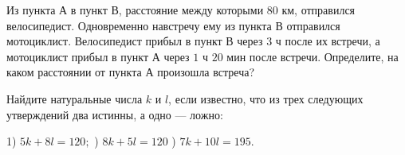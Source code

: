 Из пункта А в пункт В, расстояние между которыми 80 км, отправился велосипедист. Одновременно навстречу ему из пункта В отправился мотоциклист. Велосипедист прибыл в пункт В через $3$ ч после их встречи, а мотоциклист прибыл в пункт А через $1$ ч $20$ мин после встречи. Определите, на каком расстоянии от пункта А произошла встреча?


\newpage

\hspace{3mm}

Найдите натуральные числа $k$ и $l$, если известно, что из трех следующих утверждений два истинны, а одно --- ложно:

1) $5k+8l=120;$ ) $8k+5l = 120$ ) $7k+10l=195.$ 